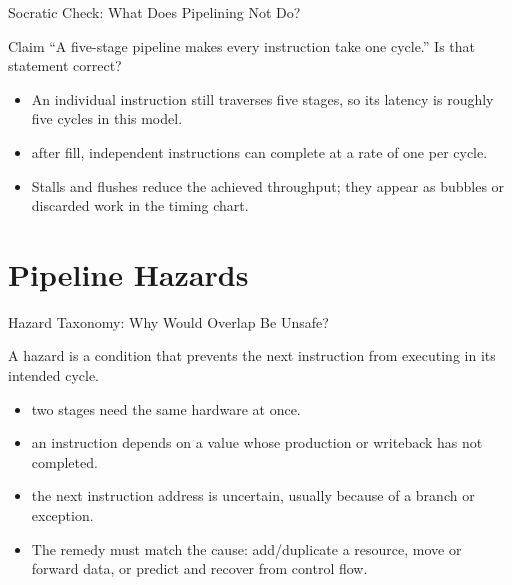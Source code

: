 \documentclass[aspectratio=169]{beamer}
\begin{document}
\begin{frame}{Socratic Check: What Does Pipelining Not Do?}
  \begin{alertblock}{Claim}
    ``A five-stage pipeline makes every instruction take one cycle.'' Is that
    statement correct?
  \end{alertblock}
  \begin{itemize}
    \item {} An individual instruction still traverses five stages, so
      its latency is roughly five cycles in this model.
    \item {} after fill, independent instructions can
      complete at a rate of one per cycle.
    \item Stalls and flushes reduce the achieved throughput; they appear as
      bubbles or discarded work in the timing chart.
  \end{itemize}
\end{frame}


\section{Pipeline Hazards}

\begin{frame}{Hazard Taxonomy: Why Would Overlap Be Unsafe?}
  \begin{block}{A hazard is a condition that prevents the next instruction
  from executing in its intended cycle.}
    \begin{itemize}
      \item {} two stages need the same hardware at once.
      \item {} an instruction depends on a value whose
        production or writeback has not completed.
      \item {} the next instruction address is uncertain,
        usually because of a branch or exception.
    \end{itemize}
  \end{block}
  \begin{itemize}
    \item The remedy must match the cause: add/duplicate a resource, move or
      forward data, or predict and recover from control flow.
  \end{itemize}
\end{frame}
\end{document}
